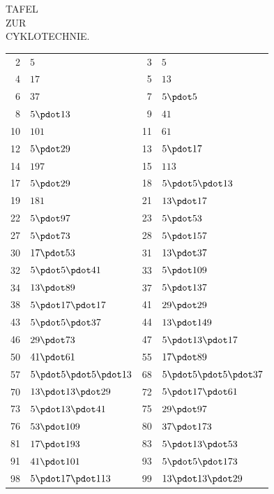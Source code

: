 \clearpage
{}%
\renewcommand{\BookRunningTitle}{Tafel zur Cyklotechnie}
\begin{center}
{\large TAFEL}\\[3pt]
{ZUR}\\[3pt]
{CYKLOTECHNIE.}
\end{center}
%
\renewcommand{\BookRunningTitle}{Tafel zur Cyklotechnie}
\begingroup\small\setlength{\tabcolsep}{4pt}
\begin{longtable}{@{}r|l@{\qquad}r|l@{}}
2 & $5$ & 3 & $5$\\
4 & $17$ & 5 & $13$\\
6 & $37$ & 7 & $5\pdot 5$\\
8 & $5\pdot 13$ & 9 & $41$\\
10 & $101$ & 11 & $61$\\
12 & $5\pdot 29$ & 13 & $5\pdot 17$\\
14 & $197$ & 15 & $113$\\
17 & $5\pdot 29$ & 18 & $5\pdot 5\pdot 13$\\
19 & $181$ & 21 & $13\pdot 17$\\
22 & $5\pdot 97$ & 23 & $5\pdot 53$\\
27 & $5\pdot 73$ & 28 & $5\pdot 157$\\
30 & $17\pdot 53$ & 31 & $13\pdot 37$\\
32 & $5\pdot 5\pdot 41$ & 33 & $5\pdot 109$\\
34 & $13\pdot 89$ & 37 & $5\pdot 137$\\
38 & $5\pdot 17\pdot 17$ & 41 & $29\pdot 29$\\
43 & $5\pdot 5\pdot 37$ & 44 & $13\pdot 149$\\
46 & $29\pdot 73$ & 47 & $5\pdot 13\pdot 17$\\
50 & $41\pdot 61$ & 55 & $17\pdot 89$\\
57 & $5\pdot 5\pdot 5\pdot 13$ & 68 & $5\pdot 5\pdot 5\pdot 37$\\
70 & $13\pdot 13\pdot 29$ & 72 & $5\pdot 17\pdot 61$\\
73 & $5\pdot 13\pdot 41$ & 75 & $29\pdot 97$\\
76 & $53\pdot 109$ & 80 & $37\pdot 173$\\
81 & $17\pdot 193$ & 83 & $5\pdot 13\pdot 53$\\
91 & $41\pdot 101$ & 93 & $5\pdot 5\pdot 173$\\
98 & $5\pdot 17\pdot 113$ & 99 & $13\pdot 13\pdot 29$\\

\end{longtable}
